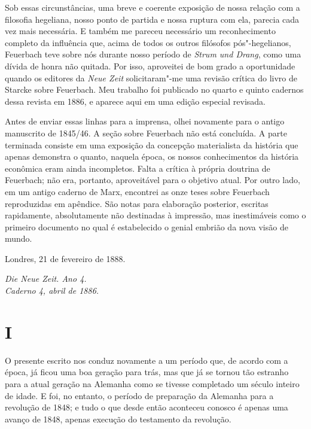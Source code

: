 Sob essas circunstâncias, uma breve e coerente exposição de nossa
relação com a filosofia hegeliana, nosso ponto de partida e nossa
ruptura com ela, parecia cada vez mais necessária. E também me pareceu
necessário um reconhecimento completo da influência que, acima de todos
os outros filósofos pós"-hegelianos, Feuerbach teve sobre nós durante
nosso período de \emph{Strum und Drang}, como uma dívida de honra não
quitada. Por isso, aproveitei de bom grado a oportunidade quando os
editores da \emph{Neue Zeit} solicitaram"-me uma revisão crítica do
livro de Starcke sobre Feuerbach. Meu trabalho foi publicado no quarto e
quinto cadernos dessa revista em 1886, e aparece aqui em uma edição
especial revisada.

Antes de enviar essas linhas para a imprensa, olhei novamente para o antigo
manuscrito de 1845/46. A seção sobre Feuerbach não está
concluída. A parte terminada consiste em uma exposição da concepção
materialista da história que apenas demonstra o quanto, naquela época,
os nossos conhecimentos da história econômica eram ainda incompletos.
Falta a crítica à própria doutrina de Feuerbach; não era, portanto,
aproveitável para o objetivo atual. Por outro lado, em um antigo caderno
de Marx, encontrei as onze teses sobre Feuerbach reproduzidas em
apêndice. São notas para elaboração posterior, escritas rapidamente,
absolutamente não destinadas à impressão, mas inestimáveis ​​como o
primeiro documento no qual é estabelecido o genial embrião da nova
visão de mundo.

\bigskip

\hfill{}Londres, 21 de fevereiro de 1888. 

\quebra

\begin{flushright}
\emph{Die Neue Zeit. Ano 4.}\\
\emph{Caderno 4, abril de 1886.}
\end{flushright}

\vspace{2cm}


\section{I}

\noindent{}O presente escrito
nos conduz novamente a um período que, de acordo com a época, já ficou
uma boa geração para trás, mas que já se tornou tão estranho 
para a atual geração na Alemanha como se tivesse
completado um século inteiro de idade. E foi, no entanto, o período de
preparação da Alemanha para a revolução de 1848; e tudo o que desde
então aconteceu conosco é apenas uma avanço de 1848, apenas execução do
testamento da revolução.


